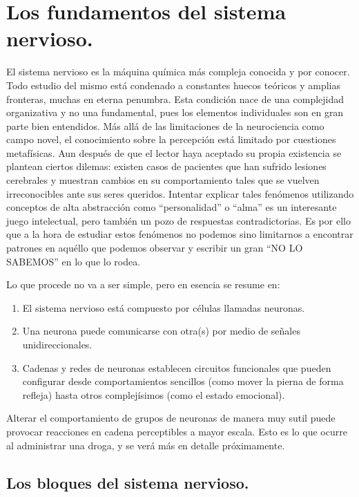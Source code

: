 \section{Los fundamentos del sistema nervioso.}

El sistema nervioso es la máquina química más compleja conocida y por conocer. Todo estudio del mismo está condenado a constantes huecos teóricos y amplias fronteras, muchas en eterna penumbra. Esta condición nace de una complejidad organizativa y no una fundamental, pues los elementos individuales son en gran parte bien entendidos. Más allá de las limitaciones de la neurociencia como campo novel, el conocimiento sobre la percepción está limitado por cuestiones metafísicas. Aun después de que el lector haya aceptado su propia existencia se plantean ciertos dilemas: existen casos de pacientes que han sufrido lesiones cerebrales y muestran cambios en su comportamiento tales que se vuelven irreconocibles ante sus seres queridos. Intentar explicar tales fenómenos utilizando conceptos de alta abstracción como \enquote{personalidad} o \enquote{alma} es un interesante juego intelectual, pero también un pozo de respuestas contradictorias. Es por ello que a la hora de estudiar estos fenómenos no podemos sino limitarnos a encontrar patrones en aquéllo que podemos observar y escribir un gran \enquote{NO LO SABEMOS} en lo que lo rodea.

Lo que procede no va a ser simple, pero en esencia se resume en:

\begin{enumerate}
	\item El sistema nervioso está compuesto por células llamadas neuronas.
	\item Una neurona puede comunicarse con otra(s) por medio de señales unidireccionales.
	\item Cadenas y redes de neuronas establecen circuitos funcionales que pueden configurar desde comportamientos sencillos (como mover la pierna de forma refleja) hasta otros complejísimos (como el estado emocional).
\end{enumerate}

Alterar el comportamiento de grupos de neuronas de manera muy sutil puede provocar reacciones en cadena perceptibles a mayor escala. Esto es lo que ocurre al administrar una droga, y se verá más en detalle próximamente.

\subsection{Los bloques del sistema nervioso.}

